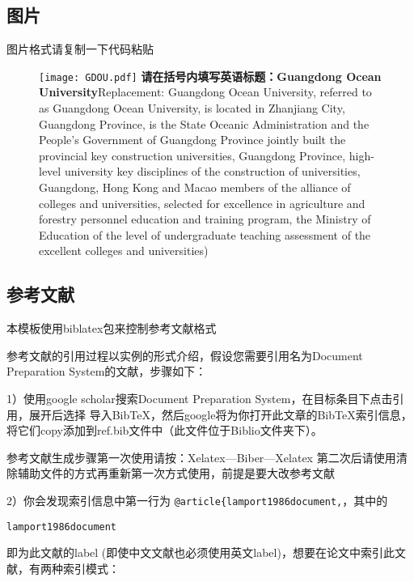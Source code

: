 \subsection{图片}
图片格式请复制一下代码粘贴
\begin{figure}[htbp]
	\centering
	\texttt{[image: GDOU.pdf]}
	{\textbf{请在括号内填写英语标题：Guangdong Ocean University}{\linebreak{}Replacement: Guangdong Ocean University, referred to as Guangdong Ocean University, is located in Zhanjiang City, Guangdong Province, is the State Oceanic Administration and the People's Government of Guangdong Province jointly built the provincial key construction universities, Guangdong Province, high-level university key disciplines of the construction of universities, Guangdong, Hong Kong and Macao members of the alliance of colleges and universities, selected for excellence in agriculture and forestry personnel education and training program, the Ministry of Education of the level of undergraduate teaching assessment of the excellent colleges and universities)}}
	\label{图片标签}
\end{figure}

\subsection{参考文献}
本模板使用biblatex包来控制参考文献格式

参考文献的引用过程以实例的形式介绍，假设您需要引用名为Document Preparation System的文献，步骤如下：

1）使用google scholar搜索Document Preparation System，在目标条目下点击引用，展开后选择 导入BibTeX，然后google将为你打开此文章的BibTeX索引信息，将它们copy添加到ref.bib文件中（此文件位于Biblio文件夹下）。

参考文献生成步骤第一次使用请按：Xelatex---Biber---Xelatex
第二次后请使用清除辅助文件的方式再重新第一次方式使用，前提是要大改参考文献

2）你会发现索引信息中第一行为 \verb|@article{lamport1986document,|，其中的 
	
	\verb|lamport1986document| 
	
	即为此文献的label (即使中文文献也必须使用英文label)，想要在论文中索引此文献，有两种索引模式：\cite{lamport1986document}
	
